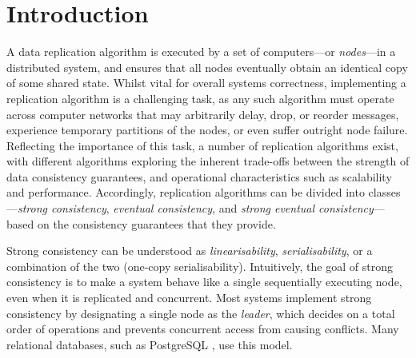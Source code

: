 \documentclass[acmlarge,review,anonymous]{acmart}
\begin{document}


\maketitle



\section{Introduction}
\label{sect.introduction}

A data replication algorithm is executed by a set of computers---or \emph{nodes}---in a distributed system, and ensures that all nodes eventually obtain an identical copy of some shared state.
Whilst vital for overall systems correctness, implementing a replication algorithm is a challenging task, as any such algorithm must operate across computer networks that may arbitrarily delay, drop, or reorder messages, experience temporary partitions of the nodes, or even suffer outright node failure.
Reflecting the importance of this task, a number of replication algorithms exist, with different algorithms exploring the inherent trade-offs between the strength of data consistency guarantees, and operational characteristics such as scalability and performance.
Accordingly, replication algorithms can be divided into classes---\emph{strong consistency}, \emph{eventual consistency}, and \emph{strong eventual consistency}---based on the consistency guarantees that they provide.

Strong consistency can be understood as \emph{linearisability}, \emph{serialisability}, or a combination of the two (one-copy serialisability).
Intuitively, the goal of strong consistency is to make a system behave like a single sequentially executing node, even when it is replicated and concurrent.
Most systems implement strong consistency by designating a single node as the \emph{leader}, which decides on a total order of operations and prevents concurrent access from causing conflicts.
Many relational databases, such as PostgreSQL \cite{postgresql}, use this model.
\end{document}
